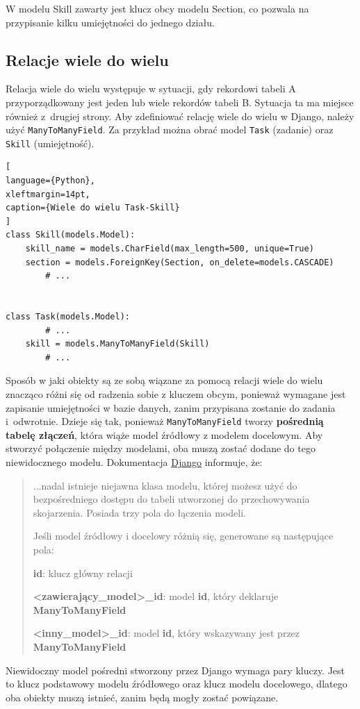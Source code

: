 \documentclass[oneside,polski,logo,indent]{amuthesis}
\begin{document}
W modelu Skill zawarty jest klucz obcy modelu Section, co pozwala na przypisanie kilku umiejętności do jednego działu.

\begin{center}
\subsection{Relacje wiele do wielu}
\end{center}
Relacja wiele do wielu występuje w sytuacji, gdy rekordowi tabeli A przyporządkowany jest jeden lub wiele rekordów tabeli B. Sytuacja ta ma miejsce również z~drugiej strony.
Aby zdefiniować relację wiele do wielu w Django, należy użyć \texttt{ManyToManyField}. Za przykład można obrać model \texttt{Task} (zadanie) oraz \texttt{Skill} (umiejętność).
\begin{lstlisting}[
language={Python},
xleftmargin=14pt,
caption={Wiele do wielu Task-Skill}
]
class Skill(models.Model):
    skill_name = models.CharField(max_length=500, unique=True)
    section = models.ForeignKey(Section, on_delete=models.CASCADE)
    	# ...


class Task(models.Model):
    	# ...
    skill = models.ManyToManyField(Skill)
    	# ...
\end{lstlisting}

Sposób w jaki obiekty są ze sobą wiązane za pomocą relacji wiele do wielu znacząco różni się od radzenia sobie z kluczem obcym, ponieważ wymagane jest zapisanie umiejętności w bazie danych, zanim przypisana zostanie do zadania i~odwrotnie. Dzieje się tak, ponieważ \texttt{ManyToManyField} tworzy \textbf{pośrednią tabelę złączeń}, która wiąże model źródłowy z modelem docelowym. Aby stworzyć połączenie między modelami, oba muszą zostać dodane do tego niewidocznego modelu. Dokumentacja \href{https://docs.djangoproject.com/en/4.0/ref/models/fields/#:~:text=If%20you%20don%E2%80%99t%20specify%20an,instance%20like%20a%20normal%20model%3A}{Django} informuje, że:
\begin{quotation}
...nadal istnieje niejawna klasa modelu, której możesz użyć do bezpośredniego dostępu do tabeli utworzonej do przechowywania skojarzenia. Posiada trzy pola do łączenia modeli.

Jeśli model źródłowy i docelowy różnią się, generowane są następujące pola:

\textbf{id}: klucz główny relacji

\textbf{<zawierający\_model>\_id}: model \textbf{id}, który deklaruje \textbf{ManyToManyField}

\textbf{<inny\_model>\_id}: model \textbf{id}, który wskazywany jest przez \textbf{ManyToManyField}
\end{quotation}
Niewidoczny model pośredni stworzony przez Django wymaga pary kluczy. Jest to klucz podstawowy modelu źródłowego oraz klucz modelu docelowego, dlatego oba obiekty muszą istnieć, zanim będą mogły zostać powiązane.
\end{document}
